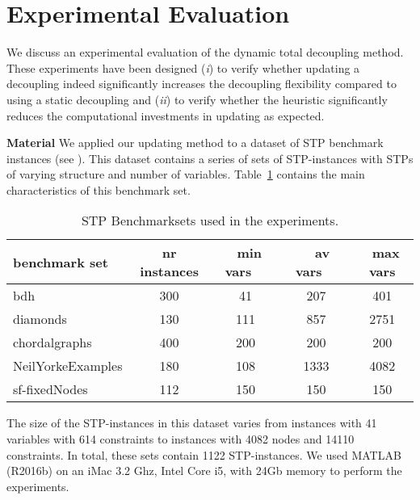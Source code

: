 \section{Experimental Evaluation}
\label{section:experiments}
We discuss an experimental evaluation of the dynamic total decoupling method.
%
These experiments have been designed (\emph{i}) to verify whether updating a decoupling indeed significantly increases the decoupling flexibility compared to using a static decoupling and (\emph{ii}) to verify whether the heuristic significantly reduces the computational investments in updating as expected.

\noindent
{\bf Material } We applied our updating method to a dataset of STP benchmark instances (see \cite{planken:2013}). This dataset contains a series of sets of STP-instances with STPs of varying structure and number of variables.
Table~\ref{table1} contains the main characteristics of this benchmark set. 
\begin{table}[h]
\begin{center}
\caption{STP Benchmarksets used in the experiments.}\label{table1}
\begin{tabular}{ | l |  c  c c c  | }
  \hline
  {\bf benchmark set} & {\bf nr instances} & \ {\bf min vars\ \ } &\ { \bf av vars\ \ } &\ {\bf max vars} \\
  \hline			
  bdh & 300 & 41  & 207 & 401 \\
  diamonds & 130 &  111 & 857 & 2751 \\
  chordalgraphs & 400 &  200 & 200 & 200 \\
  NeilYorkeExamples & 180 &  108  & 1333 & 4082 \\
  sf-fixedNodes & 112 &  150 & 150 & 150  \\
\hline  
\end{tabular}
\end{center}
\end{table}
The size of the STP-instances in this dataset varies from instances with 41 variables with 614 constraints to instances with 4082 nodes and 14110 constraints. In total, these sets contain 1122 STP-instances. 
We used MATLAB (R2016b) on an iMac 3.2 Ghz, Intel Core i5, with 24Gb memory to perform the experiments. 

